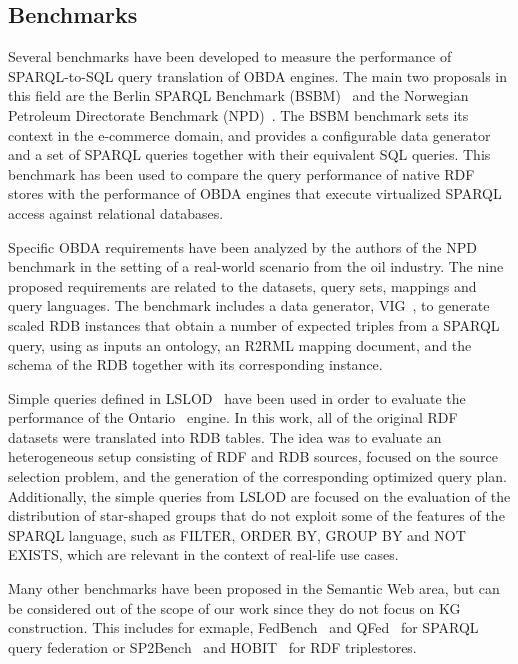 \subsection{Benchmarks}
Several benchmarks have been developed to measure the performance of SPARQL-to-SQL query translation of OBDA engines. The main two proposals in this field are the Berlin SPARQL Benchmark (BSBM)~\citep{bizer2009berlin} and the Norwegian Petroleum Directorate Benchmark (NPD)~\citep{lanti2015npd}. The BSBM benchmark sets its context in the e-commerce domain, and provides a configurable data generator and a set of SPARQL queries together with their equivalent SQL queries. This benchmark has been used to compare the query performance of native RDF stores with the performance of OBDA engines that execute virtualized SPARQL access against relational databases.

Specific OBDA requirements have been analyzed by the authors of the NPD benchmark in the setting of a real-world scenario from the oil industry. The nine proposed requirements are related to the datasets, query sets, mappings and query languages. The benchmark includes a data generator, VIG~\citep{lantivig}, to generate scaled RDB instances that obtain a number of expected triples from a SPARQL query, using as inputs an ontology, an R2RML mapping document, and the schema of the RDB together with its corresponding instance. 

Simple queries defined in LSLOD~\citep{hasnain2017biofed} have been used in order to evaluate the performance of the Ontario~\citep{endris2019ontario} engine. In this work, all of the original RDF datasets were translated into RDB tables. The idea was to evaluate an heterogeneous setup consisting of RDF and RDB sources, focused on the source selection problem, and the generation of the corresponding optimized query plan. Additionally, the simple queries from LSLOD are focused on the evaluation of the distribution of star-shaped groups that do not exploit some of the features of the SPARQL language, such as FILTER, ORDER BY, GROUP BY and NOT EXISTS, which are relevant in the context of  real-life use cases.

Many other benchmarks have been proposed in the Semantic Web area, but can be considered out of the scope of our work since they do not focus on KG construction. This includes for exmaple, FedBench~\citep{schmidt2011fedbench} and QFed~\citep{rakhmawati2014qfed} for SPARQL query federation or SP2Bench~\citep{schmidt2009sp} and HOBIT~\citep{roder2020hobbit} for RDF triplestores.

